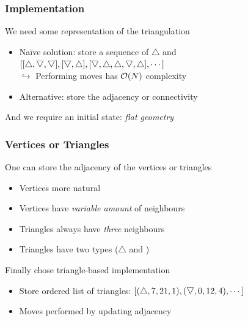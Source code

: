 
\newcommand{\tup}{\bigtriangleup}
\newcommand{\tdown}{\raisebox{\depth}{$\bigtriangledown$}}


\begin{frame}
    \frametitle{Implementation}
    We need some representation of the triangulation
    \begin{itemize}
        \item Naïve solution: store a sequence of $\tup$ and \tdown \\
        \quad $[[\tup, \tdown, \tdown],
        [\tdown, \tup],
        [\tdown, \tup, \tup, \tdown, \tup],
        \cdots]$ \\
        \quad $\hookrightarrow$ Performing moves has $\order{N}$ complexity
        \item Alternative: store the adjacency or connectivity %
    \end{itemize}
    And we require an initial state: \emph{flat geometry}
\end{frame}

\begin{frame}
    \frametitle{Vertices or Triangles}

    One can store the adjacency of the vertices or triangles
    \begin{itemize}
        \item Vertices more natural %
        \item Vertices have \emph{variable amount} of neighbours
        \item Triangles always have \emph{three} neighbours
        \item Triangles have two types ($\tup$ and \tdown)
    \end{itemize}
    Finally chose triangle-based implementation
    \begin{itemize}
        \item Store ordered list of triangles: $[(\tup, 7, 21, 1), (\tdown, 0, 12, 4), \cdots]$
        \item Moves performed by updating adjacency
    \end{itemize}
\end{frame}


